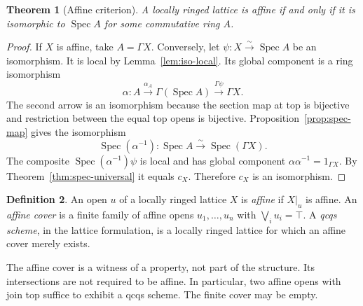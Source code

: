 \documentclass[11pt]{amsart}
\newtheorem{theorem}{Theorem}[section]
\theoremstyle{definition}
\newtheorem{definition}[theorem]{Definition}
\theoremstyle{remark}
\newcommand{\Spec}{\operatorname{Spec}}
\begin{document}
\begin{theorem}[Affine criterion]\label{thm:affine-criterion}
A locally ringed lattice is affine if and only if it is isomorphic to
$\Spec A$ for some commutative ring $A$.
\end{theorem}
\begin{proof}
If $X$ is affine, take $A=\Gamma X$. Conversely, let
$\psi:X\xrightarrow{\sim}\Spec A$ be an isomorphism. It is local by
Lemma~\ref{lem:iso-local}. Its global component is a ring isomorphism
\[
 \alpha:A\xrightarrow{\alpha_A}\Gamma(\Spec A)
             \xrightarrow{\Gamma\psi}\Gamma X.
\]
The second arrow is an isomorphism because the section map at top is
bijective and restriction between the equal top opens is bijective.
Proposition~\ref{prop:spec-map} gives the isomorphism
\[
 \Spec(\alpha^{-1}):\Spec A\xrightarrow{\sim}\Spec(\Gamma X).
\]
The composite $\Spec(\alpha^{-1})\psi$ is local and has global component
$\alpha\alpha^{-1}=1_{\Gamma X}$. By
Theorem~\ref{thm:spec-universal} it equals $c_X$. Therefore $c_X$ is an
isomorphism.
\end{proof}

\begin{definition}\label{def:qcqs}
An open $u$ of a locally ringed lattice $X$ is \emph{affine} if $X|_u$
is affine. An \emph{affine cover} is a finite family of affine opens
$u_1,\ldots,u_n$ with $\bigvee_i u_i=\top$. A \emph{qcqs scheme}, in
the lattice formulation, is a locally ringed lattice for which an affine
cover merely exists.
\end{definition}

The affine cover is a witness of a property, not part of the structure.
Its intersections are not required to be affine. In particular, two
affine opens with join top suffice to exhibit a qcqs scheme. The finite
cover may be empty.
\end{document}
